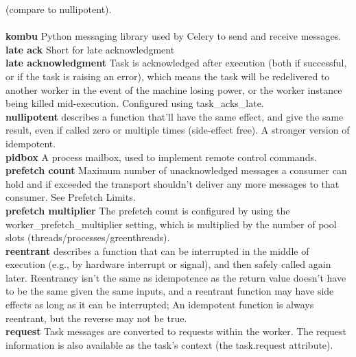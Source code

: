 \documentclass [8pt] {extarticle}
\begin{document}
(compare to nullipotent). \\
 \\
\textbf {kombu}    Python messaging library used by Celery to send and receive
messages. \\
\textbf {late ack}    Short for late acknowledgment \\
\textbf {late acknowledgment}    Task is acknowledged after execution (both if
successful, or if the task is raising an error), which means the task will be
redelivered to another worker in the event of the machine losing power, or the
worker instance being killed mid-execution. Configured using task\_acks\_late.
\\
\textbf {nullipotent} \quad describes a function that’ll have the same effect,
and give the same result, even if called zero or multiple times (side-effect
free). A stronger version of idempotent. \\
\textbf {pidbox} \quad A process mailbox, used to implement remote control
commands. \\
\textbf {prefetch count} \quad Maximum number of unacknowledged messages a
consumer can hold and if exceeded the transport shouldn’t deliver any more
messages to that consumer. See Prefetch Limits. \\
\textbf {prefetch multiplier} \quad The prefetch count is configured by using
the worker\_prefetch\_multiplier setting, which is multiplied by the number of
pool slots (threads/processes/greenthreads). \\
\textbf {reentrant} \quad describes a function that can be interrupted in the
middle of execution (e.g., by hardware interrupt or signal), and then safely
called again later. Reentrancy isn’t the same as idempotence as the return
value doesn’t have to be the same given the same inputs, and a reentrant
function may have side effects as long as it can be interrupted; An idempotent
function is always reentrant, but the reverse may not be true. \\
\textbf {request} \quad Task messages are converted to requests within the
worker. The request information is also available as the task’s context (the
task.request attribute). \\
\end{document}
